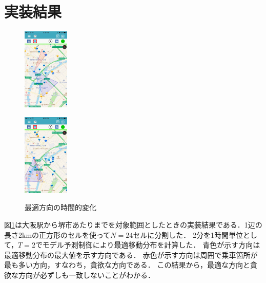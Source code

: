 \documentclass[a4j,9pt,twocolumn]{paper}
\begin{document}
\section{実装結果}
\begin{figure}[h]
  \begin{minipage}[b]{0.5\linewidth}
    \centering
    \includegraphics[keepaspectratio, width=22mm]{Graphics/201603311815.jpg}
    \label{fig:fig1-1}
  \end{minipage}
  \begin{minipage}[b]{0.5\linewidth}
    \centering
    \includegraphics[keepaspectratio, width=22mm]{Graphics/201603311824.jpg}
    \label{fig:fig1-2}
  \end{minipage}
  \caption{最適方向の時間的変化}\label{fig:fig1}
\end{figure}
図\ref{fig:fig1}は大阪駅から堺市あたりまでを対象範囲としたときの実装結果である．1辺の長さ2kmの正方形のセルを使って$N=24$セルに分割した．
2分を1時間単位として，$T=2$でモデル予測制御により最適移動分布を計算した．
青色が示す方向は最適移動分布の最大値を示す方向である．
赤色が示す方向は周囲で乗車箇所が最も多い方向，すなわち，貪欲な方向である．
この結果から，最適な方向と貪欲な方向が必ずしも一致しないことがわかる．

%
%
\newpage
\pagebreak
\end{document}
